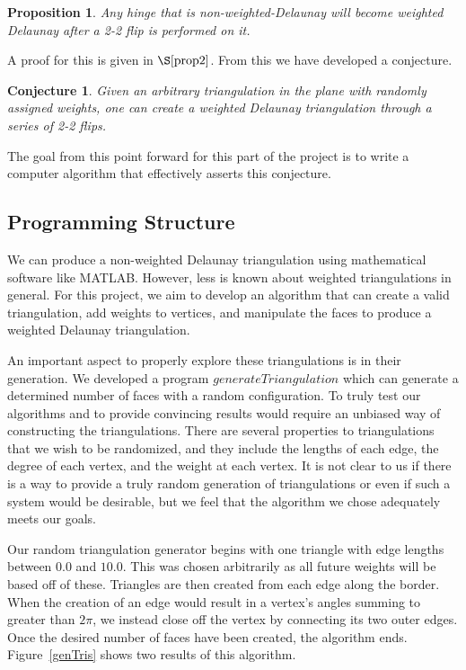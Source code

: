 \documentclass[12pt]{article}
\newtheorem{proposition}[theorem]{Proposition}
\newtheorem{conjecture}[theorem]{Conjecture}
\begin{document}
\begin{proposition}
\label{weidelprop}
Any hinge that is non-weighted-Delaunay will become weighted Delaunay after a 2-2 flip is performed on it.
\end{proposition}

 A proof for this is given in $\S\ref{prop2}$. From this we have developed a conjecture.

\begin{conjecture}
\label{flipConj}
Given an arbitrary triangulation in the plane with randomly assigned weights, one can create a weighted Delaunay triangulation through a series of 2-2 flips.
\end{conjecture}

 The goal from this point forward for this part of the project is to write a computer algorithm that effectively asserts this conjecture.

\subsection{Programming Structure}
 We can produce a non-weighted Delaunay triangulation using mathematical software like MATLAB. However, less is known about weighted triangulations in general. For this project, we aim to develop an algorithm that can create a valid triangulation, add weights to vertices, and manipulate the faces to produce a weighted Delaunay triangulation.

 An important aspect to properly explore these triangulations is in their generation. We developed a program $generateTriangulation$ which can generate a determined number of faces with a random configuration. To truly test our algorithms and to provide convincing results would require an unbiased way of constructing the triangulations. There are several properties to triangulations that we wish to be randomized, and they include the lengths of each edge, the degree of each vertex, and the weight at each vertex. It is not clear to us if there is a way to provide a truly random generation of triangulations or even if such a system would be desirable, but we feel that the algorithm we chose adequately meets our goals.

 Our random triangulation generator begins with one triangle with edge lengths between $0.0$ and $10.0$. This was chosen arbitrarily as all future weights will be based off of these. Triangles are then created from each edge along the border. When the creation of an edge would result in a vertex's angles summing to greater than $2\pi$, we instead close off the vertex by connecting its two outer edges. Once the desired number of faces have been created, the algorithm ends. Figure~\ref{genTris} shows two results of this algorithm.
\end{document}
